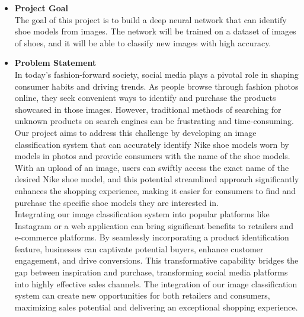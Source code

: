\documentclass{article}
\begin{document}
        \begin{itemize}
	   \item[] \textbf{Project Goal} \\
		The goal of this project is to build a deep neural network that can identify shoe models from images. The network will be trained on a dataset of images of shoes, and it will be able to classify new images with high accuracy. 
		
            \item[] \textbf{Problem Statement} \\
		In today's fashion-forward society, social media plays a pivotal role in shaping consumer habits and driving trends. As people browse through fashion photos online, they seek convenient ways to identify and purchase the products showcased in those images. However, traditional methods of searching for unknown products on search engines can be frustrating and time-consuming. \\

  


Our project aims to address this challenge by developing an image classification system that can accurately identify Nike shoe models worn by models in photos and provide consumers with the name of the shoe models. With an upload of an image, users can swiftly access the exact name of the desired Nike shoe model, and this potential streamlined approach significantly enhances the shopping experience, making it easier for consumers to find and purchase the specific shoe models they are interested in. \\

  
  

Integrating our image classification system into popular platforms like Instagram or a web application can bring significant benefits to retailers and e-commerce platforms. By seamlessly incorporating a product identification feature, businesses can captivate potential buyers, enhance customer engagement, and drive conversions. This transformative capability bridges the gap between inspiration and purchase, transforming social media platforms into highly effective sales channels. The integration of our image classification system can create new opportunities for both retailers and consumers, maximizing sales potential and delivering an exceptional shopping experience. 


\end{itemize}
\end{document}
